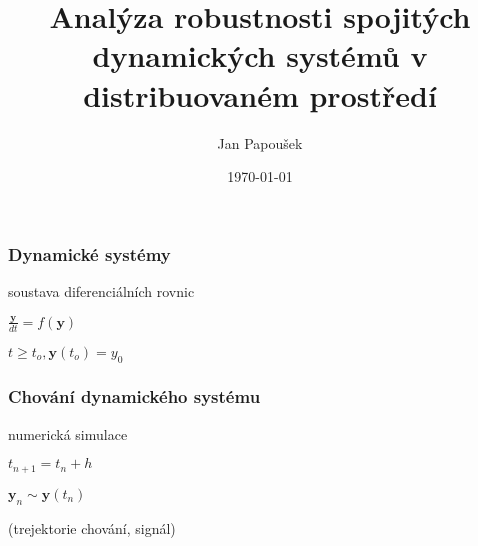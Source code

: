 \documentclass[xcolor=svgnames]{beamer}
\title[Parasim]{Analýza robustnosti spojitých dynamických systémů v distribuovaném prostředí}
\author{Jan Papoušek}
\institute{Masaryk University Brno}
\date{\today}
\begin{document}
\frame[plain]{\titlepage}
\begin{frame}
	\frametitle{Dynamické systémy}
	\begin{center}
		soustava diferenciálních rovnic

		\bigskip
		\bigskip

		{\Huge$\frac{\textbf{y}}{dt} = f(\textbf{y})$}

		\bigskip
		$t \geq t_o, \textbf{y}(t_o) = y_0$
	\end{center}
\end{frame}
\begin{frame}
	\frametitle{Chování dynamického systému}
	\begin{center}
		numerická simulace

		\bigskip
		\bigskip

		{\large$t_{n+1} = t_n + h$}

		\bigskip
		{\Huge$\textbf{y}_n \sim \textbf{y}(t_n)$}

		\bigskip
		\bigskip
		(trejektorie chování, signál)
	\end{center}
\end{frame}
\end{document}

